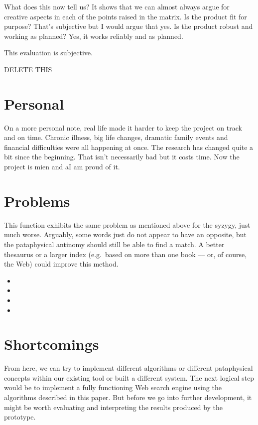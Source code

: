 \begin{draft}
  What does this now tell us? It shows that we can almost always argue for creative aspects in each of the points raised in the matrix. Is the product fit for purpose? That's subjective but I would argue that yes. Is the product robust and working as planned? Yes, it works reliably and as planned.

  This evaluation is subjective.
\end{draft}



\begin{draft}
  DELETE THIS


\section{Personal}

On a more personal note, real life made it harder to keep the project on track and on time. Chronic illness, big life changes, dramatic family events and financial difficulties were all happening at once. The research has changed quite a bit since the beginning. That isn't necessarily bad but it costs time. Now the project is mien and aI am proud of it.


\section{Problems}

This function exhibits the same problem as mentioned above for the syzygy, just much worse. Arguably, some words just do not appear to have an opposite, but the pataphysical antinomy should still be able to find a match. A better thesaurus or a larger index (e.g.\ based on more than one book –-- or, of course, the Web) could improve this method.

\begin{itemize}
  \item
  \item
  \item 
  \item
\end{itemize}


\section{Shortcomings}

From here, we can try to implement different algorithms or different pataphysical concepts within our existing tool or built a different system. The next logical step would be to implement a fully functioning Web search engine using the algorithms described in this paper. But before we go into further development, it might be worth evaluating and interpreting the results produced by the prototype.


\end{draft}
